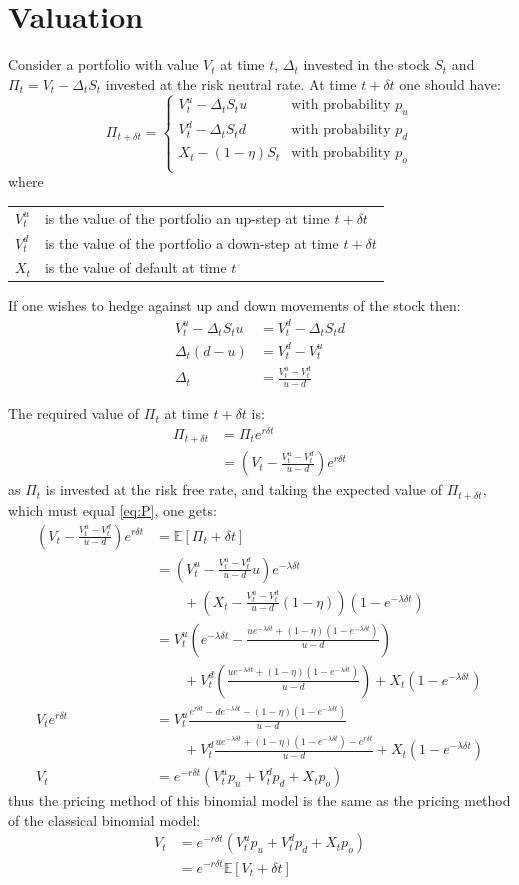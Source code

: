 \documentclass[a4paper,11pt,oneside]{report}
\theoremstyle{plain}
\theoremstyle{definition}
\def\n{\nonumber\\}
\def\E[#1]{\mathbb{E}\left[#1\right]}
\def\S{\ensuremath{S_t}\xspace}
\def\Dt{\ensuremath{\delta t}\xspace}
\def\u{\ensuremath{u}\xspace}
\def\d{\ensuremath{d}\xspace}
\def\o{\ensuremath{o}\xspace}
\def\pu{\ensuremath{p_\u}\xspace}
\def\pd{\ensuremath{p_\d}\xspace}
\def\po{\ensuremath{p_\o}\xspace}
\def\V{\ensuremath{V_t}\xspace}
\def\Vu{\ensuremath{V^{u}_t}\xspace}
\def\Vd{\ensuremath{V^{d}_t}\xspace}
\def\X{\ensuremath{X_t}\xspace}
\def\P{\ensuremath{\Pi_t}\xspace}
\def\D{\ensuremath{\Delta_t}\xspace}
\begin{document}
\section{Valuation}
Consider a portfolio with value \V at time $t$, \D invested in the stock \S and $\P = \V - \D\S$ invested at the risk neutral rate.  At time $t + \Dt$ one should have:
\begin{equation*}
 \Pi_{t + \Dt} =
 \begin{cases}
  \Vu - \D\S u          & \text{with probability } \pu \\
  \Vd - \D\S d          & \text{with probability } \pd\\
  \X - (1 - \eta)\S     & \text{with probability } \po\\
 \end{cases}
\end{equation*}
where

\begin{tabular}{ll}
 $\Vu$          & is the value of the portfolio an up-step at time $t + \Dt$ \\
 $\Vd$          & is the value of the portfolio a down-step at time $t + \Dt$ \\
 $\X$           & is the value of default at time $t$ \\
\end{tabular}

If one wishes to hedge against up and down movements of the stock then:
\begin{align}
    \Vu - \D\S u &= \Vd - \D\S d \n
       \D(d - u) &= \Vd - \Vu \n
              \D &= \frac{\Vu - \Vd}{u - d}
\end{align}

The required value of \P at time $t + \Dt$ is:
\begin{align}
 \Pi_{t + \Dt}  &= \P e^{r\Dt} \n
                &= \left(\V - \frac{\Vu - \Vd}{u - d}\right) e^{r\Dt} \label{eq:P}
\end{align}
as \P is invested at the risk free rate, and taking the expected value of $\Pi_{t + \Dt}$, which must equal \eqref{eq:P}, one gets:
\begin{align}
 (\V - \frac{\Vu - \Vd}{u - d}) e^{r\Dt} &= \E[\Pi_{t + \Dt}] \n
        &= \left(\Vu - \frac{\Vu - \Vd}{u - d}u\right) e^{-\lambda\Dt} \n
        &\qquad + \left(\X - \frac{\Vu - \Vd}{u - d}(1 - \eta)\right)(1 - e^{-\lambda\Dt}) \n
        &= \Vu\left(e^{-\lambda\Dt} - \frac{ue^{-\lambda\Dt} + (1 - \eta)(1 - e^{-\lambda\Dt})}{u - d}\right) \n
        &\qquad + \Vd\left(\frac{ue^{-\lambda\Dt} + (1 - \eta)(1 - e^{-\lambda\Dt})}{u - d}\right) + \X(1 - e^{-\lambda\Dt}) \n
 \V e^{r\Dt} &= \Vu\frac{e^{r\Dt} - de^{-\lambda\Dt} - (1 - \eta)(1 - e^{-\lambda\Dt})}{u - d} \n
        &\qquad + \Vd\frac{ue^{-\lambda\Dt} + (1 - \eta)(1 - e^{-\lambda\Dt}) - e^{r\Dt}}{u - d} + \X(1 - e^{-\lambda\Dt}) \n
 \V     &= e^{-r\Dt}(\Vu\pu + \Vd\pd + \X\po)
\end{align}
thus the pricing method of this binomial model is the same as the pricing method of the classical binomial model:
\begin{align}
 V_t    &= e^{-r\Dt}(\Vu\pu + \Vd\pd + \X\po) \n
        &= e^{-r\Dt}\E[V_{t + \Dt}]
\end{align}
\end{document}
